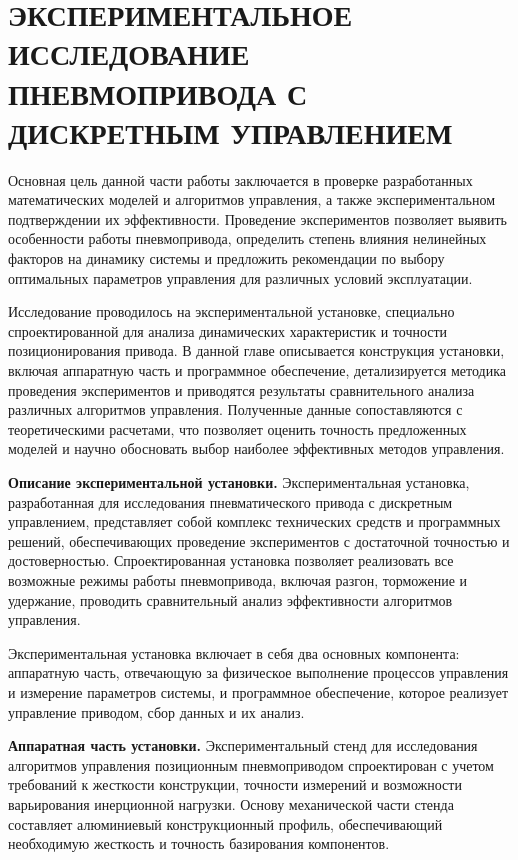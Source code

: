 \chapter{ЭКСПЕРИМЕНТАЛЬНОЕ ИССЛЕДОВАНИЕ ПНЕВМОПРИВОДА С ДИСКРЕТНЫМ УПРАВЛЕНИЕМ}\label{ch:ch4}
Основная цель данной части работы заключается в проверке разработанных
математических моделей и алгоритмов управления,
а также экспериментальном подтверждении их эффективности. Проведение экспериментов позволяет
выявить особенности работы пневмопривода, определить степень влияния
нелинейных факторов на динамику системы и предложить рекомендации по
выбору оптимальных параметров управления для различных условий эксплуатации.

Исследование проводилось на экспериментальной установке,
специально спроектированной для анализа динамических характеристик и
точности позиционирования привода. В данной главе описывается конструкция
установки, включая аппаратную часть и программное обеспечение, детализируется
методика проведения экспериментов и приводятся результаты сравнительного
анализа различных алгоритмов управления. Полученные данные сопоставляются с
теоретическими расчетами, что позволяет оценить точность предложенных моделей
и научно обосновать выбор наиболее эффективных методов управления.

\textbf{Описание экспериментальной установки.}
Экспериментальная установка, разработанная для исследования пневматического привода с
дискретным управлением, представляет собой комплекс технических средств и
программных решений, обеспечивающих проведение экспериментов с достаточной точностью и достоверностью.
Спроектированная установка позволяет реализовать все возможные режимы работы
пневмопривода, включая разгон, торможение и удержание,
проводить сравнительный анализ эффективности алгоритмов управления.

Экспериментальная установка включает в себя два основных компонента:
аппаратную часть, отвечающую за физическое выполнение процессов управления и
измерение параметров системы, и программное обеспечение, которое реализует
управление приводом, сбор данных и их анализ.

\textbf{Аппаратная часть установки.}
Экспериментальный стенд для исследования алгоритмов управления позиционным пневмоприводом
спроектирован с учетом требований к жесткости конструкции, точности измерений и возможности
варьирования инерционной нагрузки. Основу механической части стенда составляет алюминиевый
конструкционный профиль, обеспечивающий необходимую жесткость и точность базирования компонентов.

